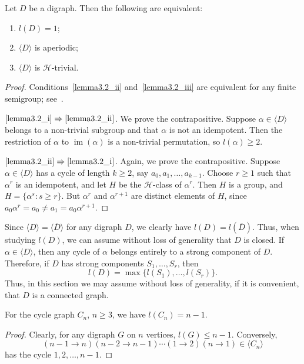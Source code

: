 \documentclass[ALCO,ThmDefs,Unicode,epreuves]{cedram}
\DeclareMathOperator{\im}{im}
\newcommand{\genset}[1]{\langle#1\rangle}
\newcommand{\set}[2]{\{#1:#2\}}
\newcommand{\Hcal}{\mathcal{H}}
\begin{document}
\begin{lemma} \label{lem:H-trivial}
 Let $D$ be a digraph. Then the following are equivalent:
 \begin{enumerate}[(\roman*)]
 \item\label{lemma3.2_i} $l(D) = 1$;
 \item\label{lemma3.2_ii} $\genset{D}$ is aperiodic;
 \item\label{lemma3.2_iii} $\genset{D}$ is $\Hcal$-trivial.
 \end{enumerate}
\end{lemma}
\begin{proof}
 Conditions~\ref{lemma3.2_ii} and~\ref{lemma3.2_iii} are equivalent for any finite semigroup;
 see~\cite[Proposition~4.2]{Pin1986aa}. 

 $\ref{lemma3.2_i}\Rightarrow \ref{lemma3.2_ii}$. We prove the contrapositive. Suppose
 $\alpha\in\genset{D}$ belongs to a non-trivial subgroup and that $\alpha$ is
 not an idempotent. Then the restriction of $\alpha$ to $\im(\alpha)$ is a
 non-trivial permutation, so $l(\alpha)\geq2$.

$\ref{lemma3.2_ii}\Rightarrow \ref{lemma3.2_i}$. Again, we prove the contrapositive. Suppose
 $\alpha\in\genset{D}$ has a cycle of length $k\geq2$, say $a_0, a_1, \dots,
 a_{k-1}$. Choose $r\geq1$ such that $\alpha^r$ is an idempotent, and let $H$ be
 the $\Hcal$-class of $\alpha^r$. Then $H$ is a group, and $H=\set{\alpha^s}{s\geq
 r}$. But $\alpha^r$ and $\alpha^{r+1}$ are distinct elements of $H$, since
 $a_0\alpha^r=a_0\not=a_1=a_0\alpha^{r+1}$.
\end{proof}

Since $\genset{D}=\genset{\bar D}$ for any digraph $D$, we clearly have
$l(D)=l(\bar D)$. Thus, when studying $l(D)$, we can assume without loss of
generality that $D$ is closed. If $\alpha \in \genset{D}$, then any cycle of
$\alpha$ belongs entirely to a strong component of $D$. Therefore, if $D$ has
strong components $S_1, \dots, S_r$, then
\begin{equation}\label{eq:lS1...r}
 l(D) = \max \{ l(S_1), \dots, l(S_r) \}.
\end{equation}
Thus, in this section we may assume without loss of generality, if it is
convenient, that $D$ is a connected graph. 

\begin{lemma} \label{lem:l(Cn)}
 For the cycle graph $C_n$, $n \ge 3$, we have $l(C_n) = n-1$.
\end{lemma}
\begin{proof}
 Clearly, for any digraph $G$ on $n$ vertices, $l(G) \le n-1$. Conversely, 
 \[
 (n-1\to n)(n-2\to n-1)\cdots(1\to2)(n\to1)\in\genset{C_n}
 \]
 has the cycle $1,2,\ldots,n-1$.
\end{proof}
\end{document}
